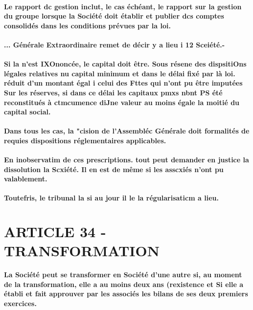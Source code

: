 \documentclass[a4paper, 11pt]{article}
\begin{document}
\paragraph{
  Le rapport dc gestion inclut, le cas échéant, le rapport sur la gestion du groupe lorsque la Société doit établir et publier dcs comptes consolidés dans les conditions prévues par la loi.
}
\paragraph{
  ... Générale Extraordinaire remet de décir y a lieu i 12 Sceiété.-
}
\paragraph{
  Si la n'est IXOnoncée, le capital doit être. Sous résene des dispsitiOns légales relatives nu capital minimum et dans le délai fixé par là loi. réduit d'un montant égal i celui des Fttes qui n'ont pu être imputées Sur les réserves, si dans ce délai les capitaux pmxs nbnt PS été reconstitués à ctmcumence diJne valeur au moins égale la moitié du capital social.
}
\paragraph{
  Dans tous les cas, la "cision de l'Assembléc Générale doit formalités de requies dispositions réglementaires applicables.
}
\paragraph{
  En inobservatim de ces prescriptions. tout peut demander en justice la dissolution la Scxiété. Il en est de même si les asscxiés n'ont pu valablement.
}
\paragraph{
  Toutefris, le tribunal la si au jour il le la régularisaticm a lieu.
}

\section*{ARTICLE 34 - TRANSFORMATION}

\paragraph{
  La Société peut se transformer en Société d'une autre si, au moment de la transformation, elle a au moins deux ans (rexistence et Si elle a établi et fait approuver par les associés les bilans de ses deux premiers exercices.
}
\end{document}
